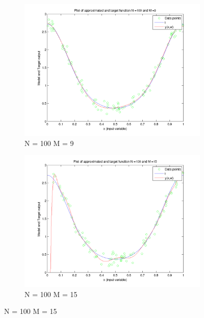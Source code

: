 \documentclass{article}
\begin{document}
\begin{figure}[H]

\begin{subfigure}{.5\textwidth}
\centering
\includegraphics[width=\linewidth]{VaryingN_N100M9}
\caption{N = 100 M = 9}
\end{subfigure}
\begin{subfigure}{.5\textwidth}
\includegraphics[width=\linewidth]{VaryingN_N100M15}
\caption{N = 100 M = 15}
\end{subfigure}



\end{figure}
\end{document}
